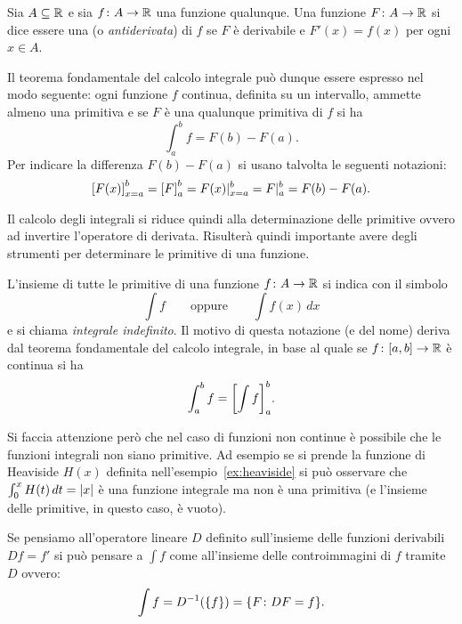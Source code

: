 \begin{definition}[primitiva]
\label{def:primitiva}%
\mymark{***}%
Sia $A \subseteq \mathbb R$ e sia $f\colon A \to \mathbb R$ una funzione qualunque.
Una funzione $F\colon A \to \mathbb R$ si dice essere una 
(o \emph{antiderivata})
di $f$ se $F$ è derivabile e $F'(x)=f(x)$ per ogni $x\in A$.
\end{definition}

Il teorema fondamentale del calcolo integrale può dunque essere espresso nel
modo seguente: ogni funzione $f$ continua, definita su un intervallo,
ammette almeno una primitiva e se $F$ è una qualunque primitiva di $f$ si ha
\[
  \int_a^b f = F(b) - F(a).
\]
Per indicare la differenza $F(b)-F(a)$ si usano
talvolta le seguenti notazioni:
\[
  {\left[ F(x) \right]}_{x=a}^b = {\left[ F \right]}_a^b
  = F(x) \vert_{x=a}^b
  = F \vert_a^b = F(b) - F(a).
\]

Il calcolo degli integrali si riduce quindi alla determinazione delle primitive
ovvero ad invertire l'operatore di derivata.
Risulterà quindi importante avere degli strumenti per determinare le primitive
di una funzione.

\begin{definition}
\mymark{***}
L'insieme di tutte le primitive di una funzione $f\colon A \to \mathbb R$
si indica con il simbolo
\[
  \int f
  \qquad\text{oppure}\qquad
  \int f(x) \, dx
\]
e si chiama \emph{integrale indefinito}.
Il motivo di questa notazione (e del nome) deriva dal teorema fondamentale del
calcolo integrale, in
base al quale se $f\colon[a,b]\to \mathbb R$
è continua si ha
\[
  \int_a^b f = {\left[ \int f \right]}_a^b.
\]
\end{definition}

\begin{remark}
Si faccia attenzione però che nel caso di funzioni non continue è possibile
che le funzioni integrali non siano primitive. Ad esempio
se si prende la funzione di Heaviside $H(x)$ definita nell'esempio~\ref{ex:heaviside}
si può osservare che $\int_0^x H(t)\, dt = {\left|x\right|}$
è una funzione integrale ma non è una primitiva (e l'insieme delle primitive,
in questo caso, è vuoto).
\end{remark}

Se pensiamo all'operatore lineare $D$ definito sull'insieme delle funzioni
derivabili $Df = f'$
si può pensare a $\int f$ come all'insieme delle controimmagini di $f$
tramite $D$ ovvero:
\[
  \int f = D^{-1}({\left\{ f \right\}}) = {\left\{ F \colon DF =f  \right\}}.
\]

